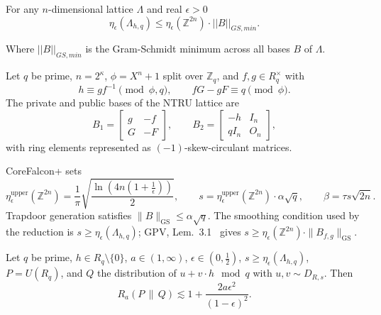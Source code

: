 \begin{definition}
For any $n$-dimensional lattice $\Lambda$ and real $\epsilon > 0$
$$
\eta_\epsilon(\Lambda_{h,q}) \le \eta_\epsilon(\mathbb{Z}^{2n}) \cdot ||B||_{GS, min}.
$$

Where $||B||_{GS, min}$ is the Gram-Schmidt minimum across all bases $B$ of $\Lambda$.

\end{definition}

\begin{definition}
Let $q$ be prime, $n = 2^\kappa$, $\phi = X^n + 1$ split over $\mathbb{Z}_q$, and $f,g \in R_q^\times$ with
\[
h \equiv gf^{-1} \pmod{\phi,q},
\qquad
fG - gF \equiv q \pmod{\phi}.
\]
The private and public bases of the NTRU lattice are
\[
B_1 =
\begin{bmatrix}
g & -f \\
G & -F
\end{bmatrix},
\qquad
B_2 =
\begin{bmatrix}
-h & I_n \\
qI_n & O_n
\end{bmatrix},
\]
with ring elements represented as $(-1)$-skew-circulant matrices.
\end{definition}

\begin{definition}
CoreFalcon+ sets
\[
\eta_\epsilon^{\mathrm{upper}}(\mathbb{Z}^{2n})
= \frac{1}{\pi}\sqrt{\frac{\ln\!\left(4n\left(1+\frac{1}{\epsilon}\right)\right)}{2}},
\qquad
s = \eta_\epsilon^{\mathrm{upper}}(\mathbb{Z}^{2n}) \cdot \alpha \sqrt{q},
\qquad
\beta = \tau s \sqrt{2n}.
\]
Trapdoor generation satisfies $\|B\|_{\mathrm{GS}} \le \alpha\sqrt{q}$.
The smoothing condition used by the reduction is $s \ge \eta_\epsilon(\Lambda_{h,q})$; GPV, Lem.~3.1~\cite{GPV2008} gives $s \ge \eta_\epsilon(\mathbb{Z}^{2n}) \cdot \|B_{f,g}\|_{\mathrm{GS}}$.
\end{definition}

\begin{corollary}\label{cor:ru-renyi}
Let \(q\) be prime, \(h \in R_q \setminus \{0\}\), \(a \in (1,\infty)\),
\(\epsilon \in (0, \frac{1}{2})\),
\(s \ge \eta_{\epsilon}(\Lambda_{h,q})\), \(P = U(R_q)\), and \(Q\) the
distribution of \(u + v \cdot h \mod q\) with \(u, v \sim D_{R,s}\).
Then
\[
R_a(P \,\|\, Q)
\lesssim
1 +
\frac{2a\epsilon^2}{(1-\epsilon)^2}.
\]
\end{corollary}


